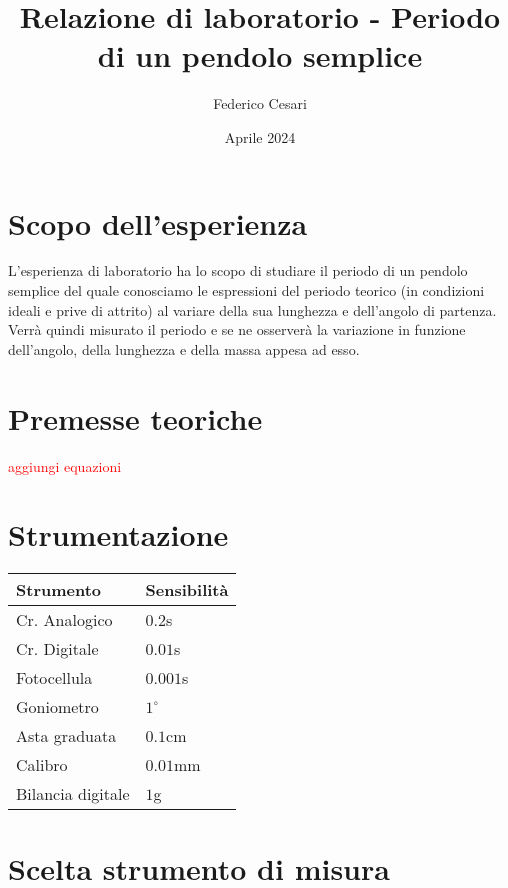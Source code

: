 \documentclass{article}
\title{Relazione di laboratorio - Periodo di un pendolo semplice}
\author{Federico Cesari}
\date{Aprile 2024}
\begin{document}

\tableofcontents

\newpage
\section{Scopo dell’esperienza}
L'esperienza di laboratorio ha lo scopo di studiare il periodo di un pendolo semplice del quale conosciamo le espressioni del periodo teorico (in condizioni ideali e prive di attrito) al variare della sua lunghezza e dell'angolo di partenza. Verrà quindi misurato il periodo e se ne osserverà la variazione in funzione dell'angolo, della lunghezza e della massa appesa ad esso.

\section{Premesse teoriche}
\textcolor{red}{aggiungi equazioni}

\section{Strumentazione}
\begin{table}[H]
	\centering
	\begin{tabular}{@{}ll@{}}
		\textbf{Strumento} & \textbf{Sensibilità} \\ \midrule
		Cr. Analogico      & $0.2$s               \\
		Cr. Digitale       & $0.01$s              \\
		Fotocellula        & $0.001$s             \\
		Goniometro         & $1^\circ$            \\
		Asta graduata      & $0.1$cm              \\
		Calibro            & $0.01$mm             \\
		Bilancia digitale  & $1$g                 \\ \bottomrule
	\end{tabular}
\end{table}









\section{Scelta strumento di misura}
\end{document}
